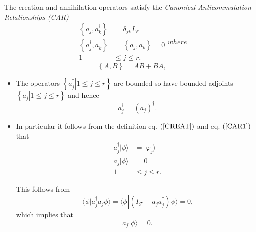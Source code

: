 \documentclass[aps, preprint]{revtex4}
\begin{document}
The creation and annihilation operators satisfy the \emph{Canonical Anticommutation Relationships
(CAR)}
\label{CAR}
\begin{subequations}
\begin{align}\left \{a_{j} ,a_{k}^{ \dag }\right \} &  =\delta _{j k} I_{\mathcal{F}} \label{CAR1} \\
\left \{a_{j}^{ \dag } ,a_{k}^{ \dag }\right \} &  =\left \{a_{j} ,a_{k}\right \} =0 \label{CAR2} \\
1 &  \leq j \leq r\text{,}\end{align}where
\end{subequations}
\begin{equation}\left \{A ,B\right \} =A B +B A\text{,}
\end{equation}


\begin{itemize}
\item The operators $\left \{\left .a_{j}^{ \dag }\right \vert 1 \leq j \leq r\right \}$ are bounded so have bounded adjoints $\left \{\left .a_{j}\right \vert 1 \leq j \leq r\right \}$ and hence
\begin{equation}a_{j}^{ \dag } =\left (a_{j}\right )^{ \dag }\text{.}
\end{equation}

\item In particular it follows from the definition eq. $\left (\ref{CREAT}\right )$ and eq. $\left (\ref{CAR1}\right )$ that
\begin{align}a_{j}^{ \dag }\vert \phi  \rangle  &  =\vert \varphi _{j} \rangle  \nonumber  \\
a_{j}\vert \phi  \rangle  &  =0 \nonumber  \\
1 &  \leq j \leq r\text{.}\end{align}

This follows from
\begin{equation} \langle \left .\phi \right \vert a_{j}^{ \dag } a_{j} \phi  \rangle  = \langle \phi \left \vert \left (I_{\mathcal{F}} -a_{j} a_{j}^{ \dag }\right )\right .\phi  \rangle  =0\text{,}
\end{equation}which implies that
\begin{equation}a_{j}\vert \phi  \rangle  =0.
\end{equation}


\end{itemize}
\end{document}

